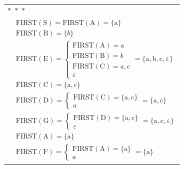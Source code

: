 \documentclass[12pt,onecolumn]{article}
\begin{document}
\begin{center}
    \begin{tabularx}{0.7\textwidth}{X}
        \vspace{1em}
        $\ast$~$\ast$~$\ast$ \\[1em]
        $\begin{aligned}
                  & \mathrm{FIRST\left(S\right)} = \mathrm{FIRST\left(A\right)} = \{ \mathrm{a} \} \\
                  & \mathrm{FIRST\left(B\right)} = \{b \}                                          \\
                  & \mathrm{FIRST\left(E\right)} =
                 \left\{
                 \begin{array}{l}
                    \mathrm{FIRST\left(A\right)} = \mathrm{a}    \\
                    \mathrm{FIRST\left(B\right)} = b             \\
                    \mathrm{FIRST\left(C\right)} = \mathrm{a, c} \\
                    \varepsilon
                \end{array}
                 \right.
                 = \{ \mathrm{a, b, c, \varepsilon}  \}                                            \\
                  & \mathrm{FIRST\left(C\right)} = \{ \mathrm{a, c}   \}                           \\
                  & \mathrm{FIRST\left(D\right)} =  \left\{
                 \begin{array}{l}
                    \mathrm{FIRST\left(C\right)} = \{ \mathrm{a, c}   \} \\
                    a
                \end{array}
                 \right. = \{ \mathrm{a, c} \}                                                     \\
                  & \mathrm{FIRST\left(G\right)} = \left\{
                 \begin{array}{l}
                    \mathrm{FIRST\left(D\right)} = \{ \mathrm{a, c} \} \\
                    \varepsilon
                \end{array}
                 \right. = \{ \mathrm{a, c, \varepsilon} \}                                        \\
                  & \mathrm{FIRST\left(A\right)} = \{ \mathrm{a} \}                                \\
                  & \mathrm{FIRST\left(F\right)} = \left\{
                 \begin{array}{l}
                    \mathrm{FIRST\left(A\right)} = \{ \mathrm{a} \} \\
                    a
                \end{array}
                 \right. = \{ \mathrm{a} \}
             \end{aligned}$


\end{tabularx}
\end{center}
\end{document}
